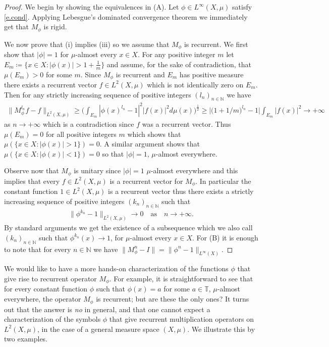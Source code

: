 \documentclass[12pt,leqno]{amsart}
\theoremstyle{plain}
\theoremstyle{definition}
\numberwithin{equation}{section}
\begin{document}
\begin{proof}
	We begin by showing the equivalences in (A). Let $\phi\in L^\infty(X,\mu)$ satisfy \eqref{e.cond}. Applying Lebesgue's dominated convergence theorem we immediately get that $M_\phi$ is rigid.
	
	We now prove that (i) implies (iii) so we assume that $M_\phi$ is recurrent. We first show that $|\phi|=1$ for $\mu$-almost every $x\in X$. For any positive integer $m$ let $E_m\coloneqq\{x\in X:|\phi(x)|>1+\frac{1}{m}\}$ and assume, for the sake of contradiction, that $\mu(E_m)>0$ for some $m$. Since $M_\phi$ is recurrent and $E_m$ has positive measure there exists a recurrent vector $f\in L^2(X,\mu)$ which is not identically zero on $E_m$. Then for any strictly increasing sequence of positive integers $(l_n)_{n\in\mathbb N}$ we have 
	\begin{align*}
		\|M_\phi ^{l_n} f-f\|_{L^2(X,\mu)}\geq\bigg( \int_{E_m}|\phi(x)^{l_n}-1|^2|f(x)|^2d\mu(x)\bigg)^\frac{1}{2}\geq {\bigl\lvert{\big(1+{1}/{m}\big)^{l_n}-1}\bigr\rvert} \int_{E_m} |f(x)|^2\to +\infty 
	\end{align*}
	as $n\to +\infty$ which is a contradiction since $f$ was a recurrent vector. Thus $\mu(E_m)=0$ for all positive integers $m$ which shows that $\mu(\{x\in X:|\phi(x)|>1\})=0.$ A similar argument shows that $\mu(\{x\in X:|\phi(x)|<1\})=0$ so that $|\phi|=1$, $\mu$-almost everywhere.
	
	Observe now that $M_\phi$ is unitary since $|\phi|=1$ $\mu$-almost everywhere and this implies that every $f\in L^2(X,\mu)$ is a recurrent vector for $M_\phi$. In particular the constant function $1\in L^2(X,\mu)$ is a recurrent vector thus there exists a strictly increasing sequence of positive integers $(k_n)_{n\in\mathbb N}$ such that 
	\begin{align*}
		\|\phi^{k_n}-1\|_{L^2(X,\mu)}\to 0\quad\text{as}\quad n\to +\infty. 
	\end{align*}
	By standard arguments we get the existence of a subsequence which we also call $(k_n)_{n\in\mathbb N}$ such that $\phi^{k_n}(x)\to 1$, for $\mu$-almost every $x\in X$. For (B) it is enough to note that for every $n\in\mathbb N$ we have $\|M_\phi ^n-I\|=\|\phi^n-1\|_{L^\infty(X)}$. 
\end{proof}

We would like to have a more hands-on characterization of the functions $\phi$ that give rise to recurrent operator $M_\phi$. For example, it is straightforward to see that for every constant function $\phi$ such that $\phi(x)=a$ for some $a\in \mathbb T$, $\mu$-almost everywhere, the operator $M_\phi$ is recurrent; but are these the only ones? It turns out that the answer is \emph{no} in general, and that one cannot expect a characterization of the symbols $\phi$ that give recurrent multiplication operators on $L^2(X,\mu)$, in the case of a general measure space $(X,\mu)$. We illustrate this by two examples. 
\end{document}
